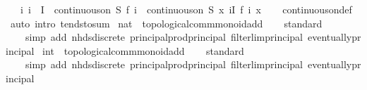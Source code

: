\begin{isabellebody}
\ \ \ {\isachardoublequoteopen}{\isacharparenleft}{\kern0pt}{\isasymAnd}i{\isachardot}{\kern0pt}\ i\ {\isasymin}\ I\ {\isasymLongrightarrow}\ continuous{\isacharunderscore}{\kern0pt}on\ S\ {\isacharparenleft}{\kern0pt}f\ i{\isacharparenright}{\kern0pt}{\isacharparenright}{\kern0pt}\ {\isasymLongrightarrow}\ continuous{\isacharunderscore}{\kern0pt}on\ S\ {\isacharparenleft}{\kern0pt}{\isasymlambda}x{\isachardot}{\kern0pt}\ {\isasymSum}i{\isasymin}I{\isachardot}{\kern0pt}\ f\ i\ x{\isacharparenright}{\kern0pt}{\isachardoublequoteclose}\isanewline
%
\isadelimproof
\ \ %
\endisadelimproof
%
\isatagproof
{}\isamarkupfalse%
\ continuous{\isacharunderscore}{\kern0pt}on{\isacharunderscore}{\kern0pt}def\ \isamarkupfalse%
\ {\isacharparenleft}{\kern0pt}auto\ intro{\isacharcolon}{\kern0pt}\ tendsto{\isacharunderscore}{\kern0pt}sum{\isacharparenright}{\kern0pt}%
\endisatagproof
{\isafoldproof}%
%
\isadelimproof
\isanewline
%
\endisadelimproof
\isanewline
{}\isamarkupfalse%
\ nat\ {\isacharcolon}{\kern0pt}{\isacharcolon}{\kern0pt}\ topological{\isacharunderscore}{\kern0pt}comm{\isacharunderscore}{\kern0pt}monoid{\isacharunderscore}{\kern0pt}add\isanewline
%
\isadelimproof
\ \ %
\endisadelimproof
%
\isatagproof
{}\isamarkupfalse%
\ standard\isanewline
\ \ \ \ {\isacharparenleft}{\kern0pt}simp\ add{\isacharcolon}{\kern0pt}\ nhds{\isacharunderscore}{\kern0pt}discrete\ principal{\isacharunderscore}{\kern0pt}prod{\isacharunderscore}{\kern0pt}principal\ filterlim{\isacharunderscore}{\kern0pt}principal\ eventually{\isacharunderscore}{\kern0pt}principal{\isacharparenright}{\kern0pt}%
\endisatagproof
{\isafoldproof}%
%
\isadelimproof
\isanewline
%
\endisadelimproof
\isanewline
{}\isamarkupfalse%
\ int\ {\isacharcolon}{\kern0pt}{\isacharcolon}{\kern0pt}\ topological{\isacharunderscore}{\kern0pt}comm{\isacharunderscore}{\kern0pt}monoid{\isacharunderscore}{\kern0pt}add\isanewline
%
\isadelimproof
\ \ %
\endisadelimproof
%
\isatagproof
{}\isamarkupfalse%
\ standard\isanewline
\ \ \ \ {\isacharparenleft}{\kern0pt}simp\ add{\isacharcolon}{\kern0pt}\ nhds{\isacharunderscore}{\kern0pt}discrete\ principal{\isacharunderscore}{\kern0pt}prod{\isacharunderscore}{\kern0pt}principal\ filterlim{\isacharunderscore}{\kern0pt}principal\ eventually{\isacharunderscore}{\kern0pt}principal{\isacharparenright}{\kern0pt}%
\endisatagproof
{\isafoldproof}%
%
\isadelimproof
%
\endisadelimproof
%
\isadelimdocument
%
\endisadelimdocument
%
\isatagdocument
%
\end{isabellebody}
